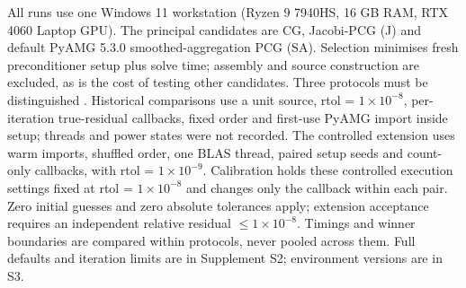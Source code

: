\documentclass[10pt]{article}
\begin{document}
All runs use one Windows 11 workstation (Ryzen 9 7940HS, 16 GB RAM, RTX 4060 Laptop GPU). The principal candidates are CG, Jacobi-PCG (J) and default PyAMG 5.3.0 smoothed-aggregation PCG (SA). Selection minimises fresh preconditioner setup plus solve time; assembly and source construction are excluded, as is the cost of testing other candidates. Three protocols must be distinguished \cite{Hoefler2015}. Historical comparisons use a unit source, rtol = \ensuremath{1\times10^{-8}}, per-iteration true-residual callbacks, fixed order and first-use PyAMG import inside setup; threads and power states were not recorded. The controlled extension uses warm imports, shuffled order, one BLAS thread, paired setup seeds and count-only callbacks, with rtol = \ensuremath{1\times10^{-9}}. Calibration holds these controlled execution settings fixed at rtol = \ensuremath{1\times10^{-8}} and changes only the callback within each pair. Zero initial guesses and zero absolute tolerances apply; extension acceptance requires an independent relative residual \ensuremath{\leq}\ensuremath{1\times10^{-8}}. Timings and winner boundaries are compared within protocols, never pooled across them. Full defaults and iteration limits are in Supplement S2; environment versions are in S3.\par
\end{document}
